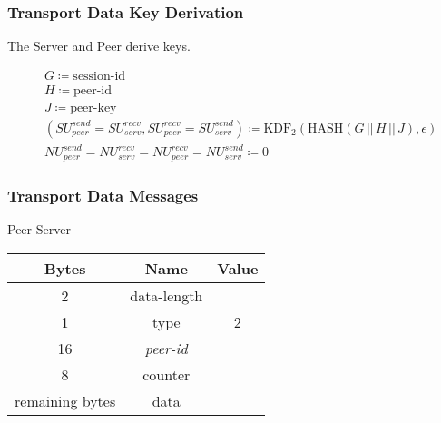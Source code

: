 \subsubsection{Transport Data Key Derivation}

The Server and Peer derive keys.

\begin{align*}
    &  G\coloneqq \text{session-id}                                                               \\
    &  H \coloneqq \text{peer-id}                                                                \\
    &  J \coloneqq \text{peer-key}                                                              \\
    &  (\mathit{SU}_{peer}^{send} = \mathit{SU}_{serv}^{recv}, \mathit{SU}_{peer}^{recv} = \mathit{SU}_{serv}^{send}) \coloneqq \text{KDF}_2(\text{HASH}(G\,
    ||\, H\,||\, J), \epsilon)                                        \\
    &   \mathit{NU}_{peer}^{send} = \mathit{NU}_{serv}^{recv} = \mathit{NU}_{peer}^{recv} = \mathit{NU}_{serv}^{send} \coloneqq 0
\end{align*}

\subsubsection{Transport Data Messages}

\begin{center}
    Peer \textrightarrow Server\\
    \begin{tabular}{|c|c|c|}
        \hline
        \textbf{Bytes}  & \textbf{Name}  & \textbf{Value} \\
        \hline
        2               & data-length    &                \\
        \hline
        1               & type           & 2              \\
        \hline
        16              & \emph{peer-id} &                \\
        \hline
        8               & counter        &                \\
        \hline
        remaining bytes & data           &                \\
        \hline
    \end{tabular}
\end{center}

